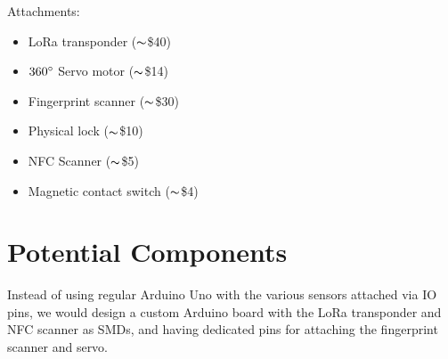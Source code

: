 \documentclass{article}
\begin{document}
\noindent
Attachments:
\begin{itemize}
  \item LoRa transponder ($\thicksim$\$40)
  \item $360\degree$ Servo motor ($\thicksim$\$14)
  \item Fingerprint scanner ($\thicksim$\$30)
  \item Physical lock ($\thicksim$\$10)
  \item NFC Scanner ($\thicksim$\$5)
  \item Magnetic contact switch ($\thicksim$\$4)
\end{itemize}

\section{Potential Components}
Instead of using regular Arduino Uno with the various sensors attached via IO
pins, we would design a custom Arduino board with the LoRa transponder and NFC
scanner as SMDs, and having dedicated pins for attaching the fingerprint scanner
and servo.
  
\end{document}
